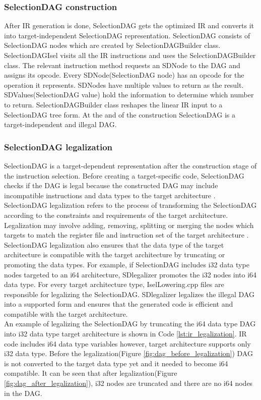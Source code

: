 \subsubsection{SelectionDAG construction}
After IR generation is done, SelectionDAG gets the optimized IR and converts it into target-independent SelectionDAG representation. SelectionDAG consists of SelectionDAG nodes which are created by SelectionDAGBuilder class. SelectionDAGIsel visits all the IR instructions and uses the SelectionDAGBuilder class. The relevant instruction method requests an SDNode to the DAG and assigns its opcode. Every SDNode(SelectionDAG node) has an opcode for the operation it represents. SDNodes have multiple values to return as the result. SDValues(SelectionDAG value) hold the information to determine which number to return. SelectionDAGBuilder class reshapes the linear IR input to a SelectionDAG tree form. At the and of the construction SelectionDAG is a target-independent and illegal DAG.

\subsubsection{SelectionDAG legalization}
SelectionDAG is a target-dependent representation after the construction stage of the instruction selection. Before creating a target-specific code, SelectionDAG checks if the DAG is legal because the constructed DAG may include incompatible instructions and data types to the target architecture \cite{legalizer}. SelectionDAG legalization refers to the process of transforming the SelectionDAG according to the constraints and requirements of the target architecture. Legalization may involve adding, removing, splitting or merging the nodes which targets to match the register file and instruction set of the target architecture \cite{llvmcookbook}. SelectionDAG legalization also ensures that the data type of the target architecture is compatible with the target architecture by truncating or promoting the data types. For example, if SelectionDAG includes i32 data type nodes targeted to an i64 architecture, SDlegalizer promotes the i32 nodes into i64 data type. For every target architecture type, IselLowering.cpp files are responsible for legalizing the SelectionDAG. SDlegalizer legalizes the illegal DAG into a supported form and ensures that the generated code is efficient and compatible with the target architecture.\\
An example of legalizing the SelectionDAG by truncating the i64 data type DAG into i32 data type target architecture is shown in Code \ref{lst:ir_legalization}. IR code includes i64 data type variables however, target architecture supports only i32 data type. Before the legalization(Figure \ref{fig:dag_before_legalization}) DAG is not converted to the target data type yet and it needed to become i64 compatible. It can be seen that after legalization(Figure \ref{fig:dag_after_legalization}), i32 nodes are truncated and there are no i64 nodes in the DAG.

